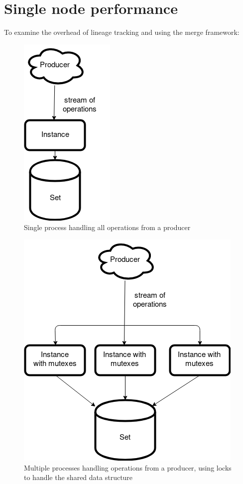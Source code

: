 \documentclass{article}
\begin{document}
\newpage
\section{Single node performance}
To examine the overhead of lineage tracking and using the merge framework:
\begin{figure}[h]
\centering
\caption{Single process handling all operations from a producer}
\includegraphics[width=0.2\textheight]{benchmark-single.png}
\end{figure}
\begin{figure}[h]
\centering
\caption{Multiple processes handling operations from a producer, using locks to handle the shared data structure}
\includegraphics[width=0.3\textheight]{benchmark-mutexes.png}
\end{figure}
\end{document}
